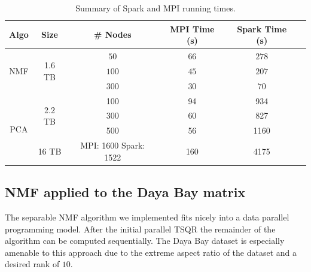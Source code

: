 \begin{table}[t]
\centering

\begin{tabular}{|c|c|c|c|c|c|} \hline
Algo & Size & \# Nodes & MPI Time (s) & Spark Time (s)\\ \hline
\multirow{3}{*}{NMF} & \multirow{3}{*}{1.6 TB} & $50$ & $66$ & $278$\\
{} & {} & $100$  & $45$ & $207$\\
{} & {} & $300$ & $30$ & $70$\\ \hline
\multirow{4}{*}{PCA} & \multirow{3}{*}{2.2 TB} & 100 & 94 & 934\\
 {} & {} & 300 & 60 & 827\\
 {} & {} & 500 & 56 & 1160\\ \cline{2-5}
 {} & {16 TB} & {MPI: 1600 Spark: 1522} & 160 & 4175 \\ \hline
\end{tabular}
\caption{{Summary of Spark and MPI running times.}}
\label{tab:matrix}
\end{table}

\subsection{NMF applied to the Daya Bay matrix}
The separable NMF algorithm we implemented fits nicely into a data parallel programming model. After the initial parallel TSQR the remainder of the algorithm can be computed sequentially. The Daya Bay dataset is especially amenable to this approach due to the extreme aspect ratio of the dataset and a desired rank of $10$.

